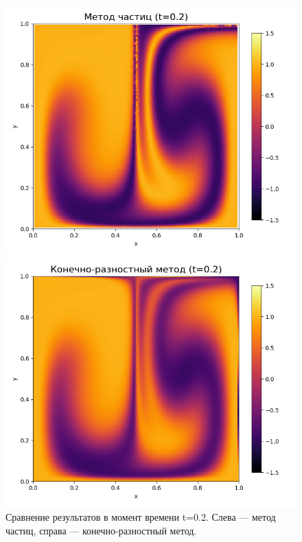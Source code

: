 \documentclass[a4paper,12pt]{article}
\begin{document}
\begin{figure}[H]
    \centering
    \begin{minipage}{0.49\textwidth}
        \centering
        \includegraphics[width=\linewidth]{comparison_results/particle_method_t_0.2.png}
    \end{minipage}
    \hfill
    \begin{minipage}{0.49\textwidth}
        \centering
        \includegraphics[width=\linewidth]{comparison_results/fdm_method_t_0.2.png}
    \end{minipage}
    \caption{Сравнение результатов в момент времени t=0.2. Слева — метод частиц, справа — конечно-разностный метод.}
    \label{fig:t02}
\end{figure}
\end{document}
